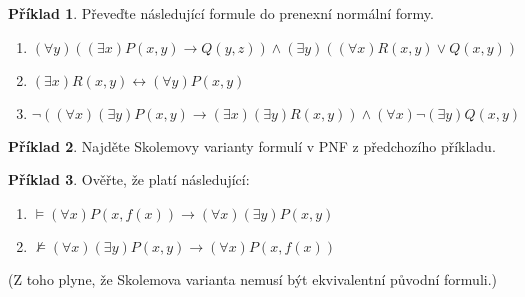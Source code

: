 \documentclass{amsart}
\theoremstyle{definition}
\newtheorem{problem}{Příklad}
\theoremstyle{remark}
\begin{document}
\medskip


\begin{problem} Převeďte následující formule do prenexní normální formy.
\begin{enumerate}
\itemsep6pt
\item $(\forall y)((\exists x)P(x,y)\to Q(y,z))\wedge (\exists y)((\forall x)R(x,y)\vee Q(x,y))$
\item $(\exists x)R(x,y)\leftrightarrow (\forall y)P(x,y)$
\item $\neg((\forall x)(\exists y)P(x,y)\to (\exists x)(\exists y)R(x,y))\wedge(\forall x)\neg(\exists y)Q(x,y)$
\end{enumerate}
\end{problem}

\medskip

\begin{problem} Najděte Skolemovy varianty formulí v PNF z předchozího příkladu.
\end{problem}

\medskip

\begin{problem} Ověřte, že platí následující:
\begin{enumerate}
\itemsep6pt
\item $\models (\forall x)P(x,f(x)) \to (\forall x)(\exists y)P(x,y)$
\item $\not\models (\forall x)(\exists y)P(x,y)\to (\forall x)P(x,f(x))$
\end{enumerate}
(Z toho plyne, že Skolemova varianta nemusí být ekvivalentní původní formuli.)
\end{problem}
\end{document}
